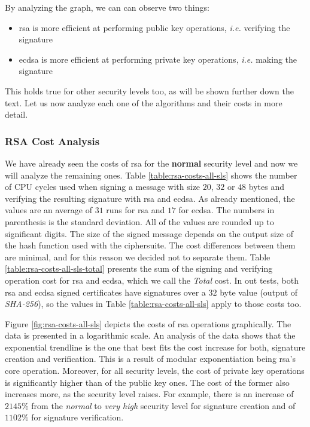 By analyzing the graph, we can can observe two things:

\begin{itemize}
  \item \gls{rsa} is more efficient at performing public key operations, \textit{i.e.} verifying the signature
  \item \gls{ecdsa} is more efficient at performing private key operations, \textit{i.e.} making the signature
\end{itemize}

This holds true for other security levels too, as will be shown further down the text. Let us now analyze each one
of the algorithms and their costs in more detail.

\subsubsection{RSA Cost Analysis}

We have already seen the costs of \gls{rsa} for the \textbf{normal} security level and now we will analyze the
remaining ones. Table \ref{table:rsa-costs-all-sls} shows the number of CPU cycles used
when signing a message with size $20$, $32$ or $48$ bytes and verifying the resulting signature with \gls{rsa} and \gls{ecdsa}.
As already mentioned, the values are an average of $31$ runs for \gls{rsa} and $17$ for \gls{ecdsa}.
The numbers in parenthesis is the standard deviation. All of the values are rounded up to significant digits. The size of the signed message depends on the output size of the
hash function used with the ciphersuite. The cost differences between them are minimal, and for this reason we decided not to separate them.
Table \ref{table:rsa-costs-all-sls-total} presents the sum of the signing and verifying operation cost for \gls{rsa} and \gls{ecdsa}, which we call the \textit{Total} cost.
In out tests, both \gls{rsa} and \gls{ecdsa} signed certificates have signatures over a $32$ byte value (output of \textit{SHA-256}), so
the values in Table \ref{table:rsa-costs-all-sls} apply to those costs too.

Figure \ref{fig:rsa-costs-all-sls} depicts the costs of \gls{rsa} operations graphically. The data is presented in a logarithmic
scale. An analysis of the data shows that the exponential trendline is the one that best fits the cost increase for both, signature creation and
verification. This is a result of modular exponentiation being \gls{rsa}'s core operation. Moreover, for all security levels, the cost of
private key operations is significantly higher than
of the public key ones. The cost of the former also increases more, as the security level raises. For example, there is an increase
of $2145\%$ from the \textit{normal} to \textit{very high} security level for signature creation and of $1102\%$ for signature verification.

